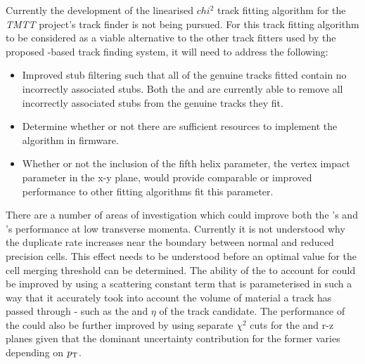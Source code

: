%


Currently the development of the linearised $chi^{2}$ track fitting algorithm for the \emph{TMTT} project's track finder is not being pursued.
For this track fitting algorithm to be considered as a viable alternative to the other track fitters used by the proposed \HT-based track finding system, it will need to address the following:

\begin{itemize}
\item Improved stub filtering such that all of the genuine tracks fitted contain no incorrectly associated stubs. Both the \KF and \LR are currently able to remove all incorrectly associated stubs from the genuine tracks they fit. 
\item Determine whether or not there are sufficient resources to implement the algorithm in firmware.
\item Whether or not the inclusion of the fifth helix parameter, the vertex impact parameter in the x-y plane, would provide comparable or improved performance to other fitting algorithms fit this parameter.
\end{itemize}

There are a number of areas of investigation which could improve both the \HT's and \KF's performance at low  transverse momenta.
Currently it is not understood why the duplicate rate increases near the boundary between normal and reduced precision \HT cells.
This effect needs to be understood before an optimal value for the cell merging threshold can be determined.
The ability of the \KF to account for \MS could be improved by using a scattering constant term that is parameterised in such a way that it accurately took into account the volume of material a track has passed through - such as the \pt and $\eta$ of the track candidate.
The performance of the \KF could also be further improved by using separate \KF $\chi^{2}$ cuts for the \rphi and r-z planes given that the dominant uncertainty contribution for the former varies depending on $p_{\mathrm{T}}$.